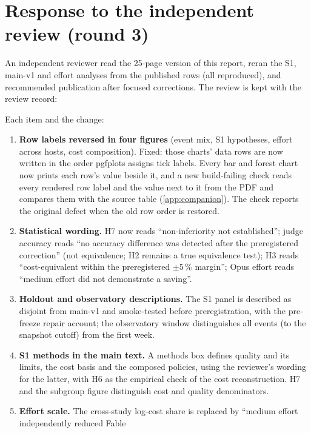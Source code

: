 \section{Response to the independent review (round 3)}\label{app:review3}

An independent reviewer read the 25-page version of this report, reran the S1, main-v1 and effort analyses from the
published rows (all reproduced), and recommended publication after focused corrections. The review is kept with the
review record:
\begin{center}\small{}\end{center} Each item and the change:
\begin{enumerate}[leftmargin=1.6em]
  \item \textbf{Row labels reversed in four figures} (event mix, S1 hypotheses, effort across hosts, cost composition).
    Fixed: those charts' data rows are now written in the order pgfplots assigns tick labels. Every bar and forest chart
    now prints each row's value beside it, and a new build-failing check reads every rendered row label and the value
    next to it from the PDF and compares them with the source table (\cref{app:companion}). The check reports the
    original defect when the old row order is restored.
  \item \textbf{Statistical wording.} H7 now reads ``non-inferiority not established''; judge accuracy reads ``no
    accuracy difference was detected after the preregistered correction'' (not equivalence; H2 remains a true
    equivalence test); H3 reads ``cost-equivalent within the preregistered $\pm$5\,\% margin''; Opus effort reads
    ``medium effort did not demonstrate a saving''.
  \item \textbf{Holdout and observatory descriptions.} The S1 panel is described as disjoint from main-v1 and smoke-tested
    before preregistration, with the pre-freeze repair account; the observatory window distinguishes all events (to the
    snapshot cutoff) from the first week.
  \item \textbf{S1 methods in the main text.} A methods box defines quality and its limits, the cost basis and the
    composed policies, using the reviewer's wording for the latter, with H6 as the empirical check of the cost
    reconstruction. H7 and the subgroup figure distinguish cost and quality denominators.
  \item \textbf{Effort scale.} The cross-study log-cost share is replaced by ``medium effort independently reduced Fable

\end{enumerate}

